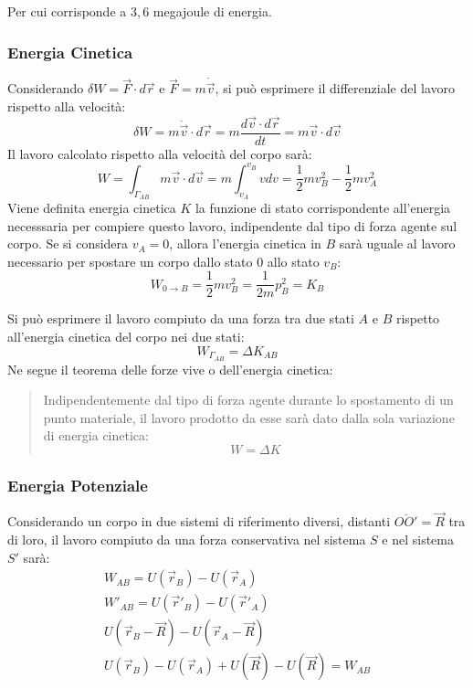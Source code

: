 \documentclass{article}
\numberwithin{equation}{subsection}
\begin{document}
Per cui corrisponde a $3,6$ megajoule di energia. 

\subsubsection{Energia Cinetica}
Considerando $\delta W=\vec{F}\cdot d\vec{r}$ e $\vec{F}=m\dot{\vec{v}}$, si può esprimere il differenziale del lavoro rispetto alla velocità:
\begin{equation*}
    \delta W=m\dot{\vec{v}}\cdot d\vec{r}=m\displaystyle\frac{d\vec{v}\cdot d\vec{r}}{dt}=m\vec{v}\cdot d\vec{v}
\end{equation*}
Il lavoro calcolato rispetto alla velocità del corpo sarà:
\begin{equation*}
    W=\int_{\Gamma_{AB}}m\vec{v}\cdot d\vec{v}=m\int_{v_A}^{v_B}vdv=\displaystyle\frac{1}{2}mv_B^2-\frac{1}{2}mv_A^2
\end{equation*}
Viene definita energia cinetica $K$ la funzione di stato corrispondente all'energia necesssaria per compiere questo 
lavoro, indipendente dal tipo di forza agente sul corpo. Se si 
considera $v_A=0$, allora l'energia cinetica in $B$ sarà uguale al 
lavoro necessario per spostare un corpo dallo stato $0$ allo stato $v_B$:
\begin{equation}
    W_{0\to B}=\displaystyle\frac{1}{2}mv_B^{2}=\frac{1}{2m}p^2_B=K_B
\end{equation}


Si può esprimere il lavoro compiuto da una forza tra due stati $A$ e $B$ rispetto all'energia cinetica del corpo nei due stati:
\begin{equation*}
    W_{\Gamma_{AB}}=\Delta K_{AB}
\end{equation*}
Ne segue il teorema delle forze vive o dell'energia cinetica:
\begin{quotation}
    Indipendentemente dal tipo di forza agente durante lo spostamento di un punto materiale, il lavoro
    prodotto da esse sarà dato dalla sola variazione di energia cinetica:
    \begin{equation}
        W=\Delta K
    \end{equation}
\end{quotation}  

\subsubsection{Energia Potenziale}
Considerando un corpo in due sistemi di riferimento diversi, distanti 
$\overline{OO'}=\vec{R}$ tra di loro, il lavoro compiuto da una forza 
conservativa nel sistema $S$ e nel sistema $S'$ sarà:
\begin{gather*}
    W_{AB}=U(\vec{r}_B)-U(\vec{r}_A)\\
    W'_{AB}=U(\vec{r}'_B)-U(\vec{r}'_A)\\
    U(\vec{r}_B-\vec{R})-U(\vec{r}_A-\vec{R})\\
    U(\vec{r}_B)-U(\vec{r}_A)+U(\vec{R})-U(\vec{R})=W_{AB}
\end{gather*}
\end{document}
